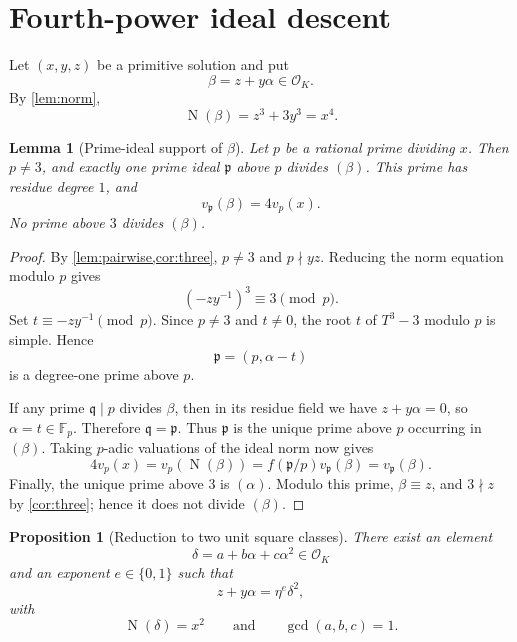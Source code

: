 \documentclass[11pt,a4paper]{article}
\newtheorem{lemma}[lemma]{Lemma}
\newtheorem{proposition}[proposition]{Proposition}
\newcommand{\F}{\mathbb F}
\newcommand{\OK}{\mathcal O_K}
\newcommand{\Norm}{\operatorname{N}}
\newcommand{\etaunit}{\eta}
\begin{document}
\section{Fourth-power ideal descent}

Let $(x,y,z)$ be a primitive solution and put
\[
\beta=z+y\alpha\in\OK.
\]
By \cref{lem:norm},
\[
\Norm(\beta)=z^3+3y^3=x^4.
\]

\begin{lemma}[Prime-ideal support of $\beta$]\label{lem:oneprime}
Let $p$ be a rational prime dividing $x$.  Then $p\ne3$, and exactly one
prime ideal $\mathfrak p$ above $p$ divides $(\beta)$.  This prime has
residue degree $1$, and
\[
v_{\mathfrak p}(\beta)=4v_p(x).
\]
No prime above $3$ divides $(\beta)$.
\end{lemma}

\begin{proof}
By \cref{lem:pairwise,cor:three}, $p\ne3$ and $p\nmid yz$.  Reducing the
norm equation modulo $p$ gives
\[
\left(-zy^{-1}\right)^3\equiv3\pmod p.
\]
Set $t\equiv-zy^{-1}\pmod p$.  Since $p\ne3$ and $t\ne0$, the root $t$
of $T^3-3$ modulo $p$ is simple.  Hence
\[
\mathfrak p=(p,\alpha-t)
\]
is a degree-one prime above $p$.

If any prime $\mathfrak q\mid p$ divides $\beta$, then in its residue
field we have $z+y\alpha=0$, so $\alpha=t\in\F_p$.  Therefore
$\mathfrak q=\mathfrak p$.  Thus $\mathfrak p$ is the unique prime above
$p$ occurring in $(\beta)$.  Taking $p$-adic valuations of the ideal norm
now gives
\[
4v_p(x)=v_p(\Norm(\beta))
 =f(\mathfrak p/p)v_{\mathfrak p}(\beta)
 =v_{\mathfrak p}(\beta).
\]
Finally, the unique prime above $3$ is $(\alpha)$.  Modulo this prime,
$\beta\equiv z$, and $3\nmid z$ by \cref{cor:three}; hence it does not
divide $(\beta)$.
\end{proof}

\begin{proposition}[Reduction to two unit square classes]\label{prop:squareclasses}
There exist an element
\[
\delta=a+b\alpha+c\alpha^2\in\OK
\]
and an exponent $e\in\{0,1\}$ such that
\begin{equation}\label{eq:beta-square}
z+y\alpha=\etaunit^e\delta^2,
\end{equation}
with
\[
\Norm(\delta)=x^2
\qquad\text{and}\qquad
\gcd(a,b,c)=1.
\]
\end{proposition}
\end{document}
